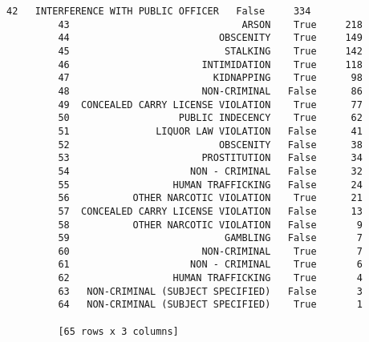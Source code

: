 \documentclass[11pt]{article}
\begin{document}
\begin{Verbatim}[commandchars=\\\{\}]
         42   INTERFERENCE WITH PUBLIC OFFICER   False     334
         43                              ARSON    True     218
         44                          OBSCENITY    True     149
         45                           STALKING    True     142
         46                       INTIMIDATION    True     118
         47                         KIDNAPPING    True      98
         48                       NON-CRIMINAL   False      86
         49  CONCEALED CARRY LICENSE VIOLATION    True      77
         50                   PUBLIC INDECENCY    True      62
         51               LIQUOR LAW VIOLATION   False      41
         52                          OBSCENITY   False      38
         53                       PROSTITUTION   False      34
         54                     NON - CRIMINAL   False      32
         55                  HUMAN TRAFFICKING   False      24
         56           OTHER NARCOTIC VIOLATION    True      21
         57  CONCEALED CARRY LICENSE VIOLATION   False      13
         58           OTHER NARCOTIC VIOLATION   False       9
         59                           GAMBLING   False       7
         60                       NON-CRIMINAL    True       7
         61                     NON - CRIMINAL    True       6
         62                  HUMAN TRAFFICKING    True       4
         63   NON-CRIMINAL (SUBJECT SPECIFIED)   False       3
         64   NON-CRIMINAL (SUBJECT SPECIFIED)    True       1
         
         [65 rows x 3 columns]
\end{Verbatim}
            
\end{document}
